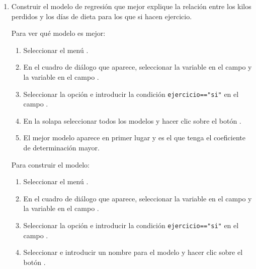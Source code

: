 \begin{enumerate}[leftmargin=*]
\begin{enumerate}
\item Construir el modelo de regresión que mejor explique la relación entre los kilos perdidos y los días de dieta para
los que si hacen ejercicio.
\begin{indicacion}{
Para ver qué modelo es mejor:
\begin{enumerate}
\item Seleccionar el menú .
\item En el cuadro de diálogo que aparece, seleccionar la variable  en el campo  y la variable  en el campo .
\item Seleccionar la opción  e introducir la condición \lstinline{ejercicio=="si"} en el campo .
\item En la solapa  seleccionar todos los modelos y hacer clic sobre el botón .
\item El mejor modelo aparece en primer lugar y es el que tenga el coeficiente de determinación mayor.
\end{enumerate}
Para construir el modelo:
\begin{enumerate}
\item Seleccionar el menú .
\item En el cuadro de diálogo que aparece, seleccionar la variable  en el campo  y la variable  en el campo .
\item Seleccionar la opción  e introducir la condición \lstinline{ejercicio=="si"} en el campo .
\item Seleccionar  e introducir un nombre para el modelo y hacer clic sobre el botón .
\end{enumerate}}
\end{indicacion}

\end{enumerate}


\end{enumerate}
